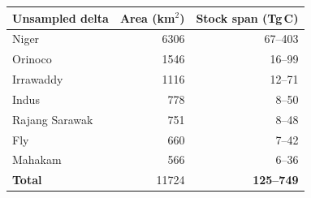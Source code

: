 \begin{tabular}{lrr}
\toprule
Unsampled delta & Area (km$^2$) & Stock span (Tg\,C) \\
\midrule
Niger & 6306 & 67--403 \\
Orinoco & 1546 & 16--99 \\
Irrawaddy & 1116 & 12--71 \\
Indus & 778 & 8--50 \\
Rajang Sarawak & 751 & 8--48 \\
Fly & 660 & 7--42 \\
Mahakam & 566 & 6--36 \\
\midrule
\textbf{Total} & 11724 & \textbf{125--749} \\
\bottomrule
\end{tabular}
